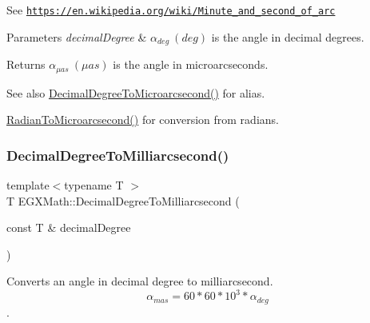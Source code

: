 See \href{https://en.wikipedia.org/wiki/Minute_and_second_of_arc}{\tt https\+://en.\+wikipedia.\+org/wiki/\+Minute\+\_\+and\+\_\+second\+\_\+of\+\_\+arc} 
\begin{DoxyParams}{Parameters}
{\em decimal\+Degree} & $\alpha_{deg}\ (deg)$ is the angle in decimal degrees. \\
\hline
\end{DoxyParams}
\begin{DoxyReturn}{Returns}
$\alpha_{\mu as}\ (\mu as)$ is the angle in microarcseconds. 
\end{DoxyReturn}
\begin{DoxySeeAlso}{See also}
\mbox{\hyperlink{group___e_g_x_math-_angle_conversions-_decimal_degree_ga6fa88456069907fd24716fa575517571}{Decimal\+Degree\+To\+Microarcsecond()}} for alias. 

\mbox{\hyperlink{group___e_g_x_math-_angle_conversions-_radian_ga3a515ca2838a305fa40750763f546a86}{Radian\+To\+Microarcsecond()}} for conversion from radians. 
\end{DoxySeeAlso}
\mbox{\label{group___e_g_x_math-_angle_conversions-_decimal_degree_gadb9ff3c92cf7484793f91e7de80c222e}} 
\subsubsection{\texorpdfstring{Decimal\+Degree\+To\+Milliarcsecond()}{DecimalDegreeToMilliarcsecond()}}
{\footnotesize\ttfamily template$<$typename T $>$ \\
T E\+G\+X\+Math\+::\+Decimal\+Degree\+To\+Milliarcsecond (\begin{DoxyParamCaption}\item[{const T \&}]{decimal\+Degree }\end{DoxyParamCaption})}



Converts an angle in decimal degree to milliarcsecond. \[\alpha_{mas}=60 * 60 * 10^3 * \alpha_{deg} \]. 

